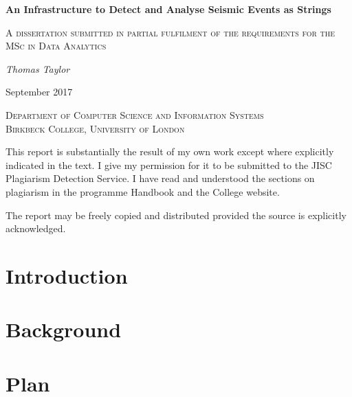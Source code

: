 \documentclass[11pt, a4paper]{scrartcl}
\begin{document}
\begin{titlepage}
	\centering
	{\huge\bfseries An Infrastructure to Detect and Analyse Seismic Events as Strings\par}
	\vspace{1cm}
	{\scshape\Large A dissertation submitted in partial fulfilment of the requirements for the MSc in Data Analytics\par}
	\vspace{1.5cm}
	{\Large\itshape Thomas Taylor\par}
	{\large September 2017\par}
	\vspace{2cm}	{\scshape\LARGE Department of Computer Science and Information Systems \\ Birkbeck College, University of London \par}

	\vfill

	\begin{itshape}
		\noindent This report is substantially the result of my own work except where explicitly indicated in the text. I give my permission for it to be submitted to the JISC Plagiarism Detection Service. I have read and understood the sections on plagiarism in the programme Handbook and the College website.
		
		\noindent The report may be freely copied and distributed provided the source is explicitly acknowledged.
	\end{itshape}
	

\end{titlepage}



\tableofcontents
\listoffigures
\newpage

\section{Introduction}


\section{Background}






\section{Plan}

\end{document}
